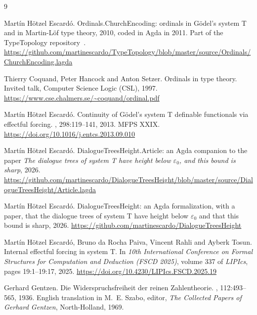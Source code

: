 \documentclass[11pt]{amsart}
\theoremstyle{plain}
\theoremstyle{definition}
\begin{document}
\begin{thebibliography}{9}

Mart\'in H\"otzel Escard\'o.
\newblock Ordinals.ChurchEncoding: ordinals in G\"odel's system T and in
  Martin-L\"of type theory, 2010, coded in Agda in 2011.
\newblock Part of the TypeTopology repository~\cite{TypeTopology}.
\newblock \url{https://github.com/martinescardo/TypeTopology/blob/master/source/Ordinals/ChurchEncoding.lagda}

Thierry Coquand, Peter Hancock and Anton Setzer.
\newblock Ordinals in type theory.
\newblock Invited talk, Computer Science Logic (CSL), 1997.
\newblock \url{https://www.cse.chalmers.se/~coquand/ordinal.pdf}

Mart\'in H\"otzel Escard\'o.
\newblock Continuity of G\"odel's system T definable functionals via
  effectful forcing.
,
  298:119--141, 2013. MFPS XXIX.
\newblock \url{https://doi.org/10.1016/j.entcs.2013.09.010}

Mart\'in H\"otzel Escard\'o.
\newblock DialogueTreesHeight.Article: an Agda companion to the paper
  {\em The dialogue trees of system T have height below
  $\varepsilon_0$, and this bound is sharp}, 2026.
\newblock \url{https://github.com/martinescardo/DialogueTreesHeight/blob/master/source/DialogueTreesHeight/Article.lagda}

Mart\'in H\"otzel Escard\'o.
\newblock DialogueTreesHeight: an Agda formalization, with a paper,
  that the dialogue trees of system T have height below
  $\varepsilon_0$ and that this bound is sharp, 2026.
\newblock \url{https://github.com/martinescardo/DialogueTreesHeight}

Mart\'in H\"otzel Escard\'o, Bruno da Rocha Paiva, Vincent Rahli and
  Ayberk Tosun.
\newblock Internal effectful forcing in system T.
\newblock In {\em 10th International Conference on Formal Structures
  for Computation and Deduction (FSCD 2025)}, volume 337 of {\em
  LIPIcs}, pages 19:1--19:17, 2025.
\newblock \url{https://doi.org/10.4230/LIPIcs.FSCD.2025.19}

Gerhard Gentzen.
\newblock Die Widerspruchsfreiheit der reinen Zahlentheorie.
, 112:493--565, 1936.
\newblock English translation in M.~E. Szabo, editor, {\em The
  Collected Papers of Gerhard Gentzen}, North-Holland, 1969.


\end{thebibliography}
\end{document}
